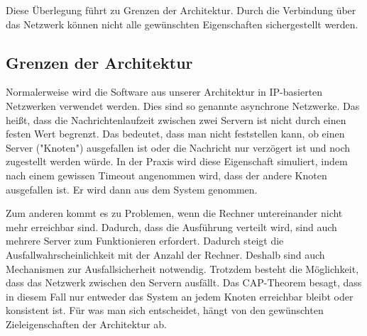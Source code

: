 Diese Überlegung führt zu Grenzen der Architektur. Durch die Verbindung über das Netzwerk können nicht alle gewünschten
Eigenschaften sichergestellt werden.

\subsection{Grenzen der Architektur}
Normalerweise wird die Software aus unserer Architektur in IP-basierten Netzwerken verwendet werden. Dies sind
so genannte asynchrone Netzwerke. Das heißt, dass die Nachrichtenlaufzeit zwischen zwei Servern ist nicht durch
einen festen Wert begrenzt. Das bedeutet, dass man nicht feststellen kann, ob einen Server ("Knoten") ausgefallen ist
oder die Nachricht nur verzögert ist und noch zugestellt werden würde. In der Praxis wird diese Eigenschaft simuliert,
indem nach einem gewissen Timeout angenommen wird, dass der andere Knoten ausgefallen ist. Er wird dann aus
dem System genommen.

Zum anderen kommt es zu Problemen, wenn die Rechner untereinander nicht mehr erreichbar sind. Dadurch, dass die
Ausführung verteilt wird, sind auch mehrere Server zum Funktionieren erfordert. Dadurch steigt die Ausfallwahrscheinlichkeit
mit der Anzahl der Rechner. Deshalb sind auch Mechanismen zur Ausfallsicherheit notwendig. Trotzdem besteht die
Möglichkeit, dass das Netzwerk zwischen den Servern ausfällt. Das CAP-Theorem besagt, dass in diesem Fall nur
entweder das System an jedem Knoten erreichbar bleibt oder konsistent ist. Für was man sich entscheidet, hängt von den
gewünschten Zieleigenschaften der Architektur ab.
